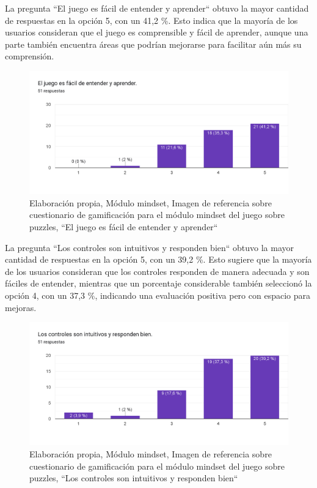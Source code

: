 La pregunta ``El juego es fácil de entender y aprender`` obtuvo la mayor cantidad de respuestas en la opción 5, con un 41,2 \%. Esto indica que la mayoría de los usuarios consideran que el juego es comprensible y fácil de aprender, aunque una parte también encuentra áreas que podrían mejorarse para facilitar aún más su comprensión.

\begin{figure}[H]
  \centering
  \includegraphics[width=0.7\linewidth]{Imagenes/mc1.png}
  \caption{Elaboración propia, Módulo mindset, Imagen de referencia sobre cuestionario de gamificación para el módulo mindset del juego sobre puzzles, ``El juego es fácil de entender y aprender``}
  \label{fig:cuestionario1mindset}
\end{figure}



La pregunta ``Los controles son intuitivos y responden bien`` obtuvo la mayor cantidad de respuestas en la opción 5, con un 39,2 \%. Esto sugiere que la mayoría de los usuarios consideran que los controles responden de manera adecuada y son fáciles de entender, mientras que un porcentaje considerable también seleccionó la opción 4, con un 37,3 \%, indicando una evaluación positiva pero con espacio para mejoras.

\begin{figure}[H]
  \centering
  \includegraphics[width=0.7\linewidth]{Imagenes/mc2.png}
  \caption{Elaboración propia, Módulo mindset, Imagen de referencia sobre cuestionario de gamificación para el módulo mindset del juego sobre puzzles, ``Los controles son intuitivos y responden bien``}
  \label{fig:cuestionario2mindset}
\end{figure}

